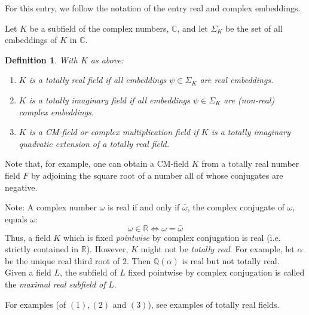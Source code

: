 \documentclass[12pt]{article}
\newtheorem{defn}{Definition}
\newcommand{\Reals}{\mathbb{R}}
\newcommand{\Complex}{\mathbb{C}}
\newcommand{\Rats}{\mathbb{Q}}
\begin{document}
For this entry, we follow the notation of the entry real and
complex embeddings.

Let $K$ be a subfield of the complex numbers, $\Complex$, and let
$\Sigma_K$ be the set of all embeddings of $K$ in $\Complex$.

\begin{defn}
With $K$ as above:
\begin{enumerate}
\item $K$ is a \emph{totally real field} if all embeddings
$\psi\in \Sigma_K$ are real embeddings.

\item $K$ is a \emph{totally imaginary field} if all embeddings
$\psi\in\Sigma_K$ are (non-real) complex embeddings.

\item $K$ is a \emph{CM-field} or \emph{complex multiplication
field} if $K$ is a totally imaginary quadratic extension of a totally real
field. 
\end{enumerate}
\end{defn}

Note that, for example, one can obtain a CM-field $K$ from a totally real number field $F$ by adjoining the square root of a number all of whose
conjugates are negative.

Note: A complex number $\omega$ is real if and only if
$\bar{\omega}$, the complex conjugate of $\omega$, equals
$\omega$:
$$\omega\in \Reals \Leftrightarrow \omega=\bar{\omega}$$
Thus, a field $K$ which is fixed \emph{pointwise} by complex
conjugation is real (i.e. strictly contained in $\Reals$). However, $K$ might not be {\it totally real}. For example, let $\alpha$ be the unique real third root of $2$. Then $\Rats(\alpha)$ is real but not totally real. \\

Given a field $L$, the subfield of
$L$ fixed pointwise by complex conjugation is called the
\emph{maximal real subfield of} $L$.

For examples (of $(1),(2)$ and $(3)$), see examples of totally real fields.
\end{document}
